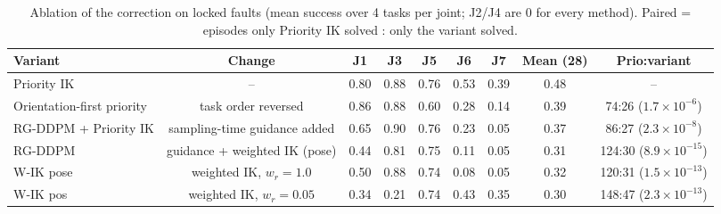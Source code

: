\begin{table}[t]
\centering
\caption{Ablation of the correction on locked faults (mean success over 4 tasks per joint; J2/J4 are 0 for every method). Paired = episodes only Priority IK solved : only the variant solved.}
\label{tab:ablation}
\setlength{\tabcolsep}{3pt}
\begin{tabular}{lcccccccc}
\toprule
Variant & Change & J1 & J3 & J5 & J6 & J7 & Mean (28) & Prio:variant \\
\midrule
Priority IK & -- & 0.80 & 0.88 & 0.76 & 0.53 & 0.39 & 0.48 & -- \\
Orientation-first priority & task order reversed & 0.86 & 0.88 & 0.60 & 0.28 & 0.14 & 0.39 & 74:26 ($1.7\times10^{-6}$) \\
RG-DDPM + Priority IK & sampling-time guidance added & 0.65 & 0.90 & 0.76 & 0.23 & 0.05 & 0.37 & 86:27 ($2.3\times10^{-8}$) \\
RG-DDPM & guidance + weighted IK (pose) & 0.44 & 0.81 & 0.75 & 0.11 & 0.05 & 0.31 & 124:30 ($8.9\times10^{-15}$) \\
W-IK pose & weighted IK, $w_r{=}1.0$ & 0.50 & 0.88 & 0.74 & 0.08 & 0.05 & 0.32 & 120:31 ($1.5\times10^{-13}$) \\
W-IK pos & weighted IK, $w_r{=}0.05$ & 0.34 & 0.21 & 0.74 & 0.43 & 0.35 & 0.30 & 148:47 ($2.3\times10^{-13}$) \\
\bottomrule
\end{tabular}
\end{table}
